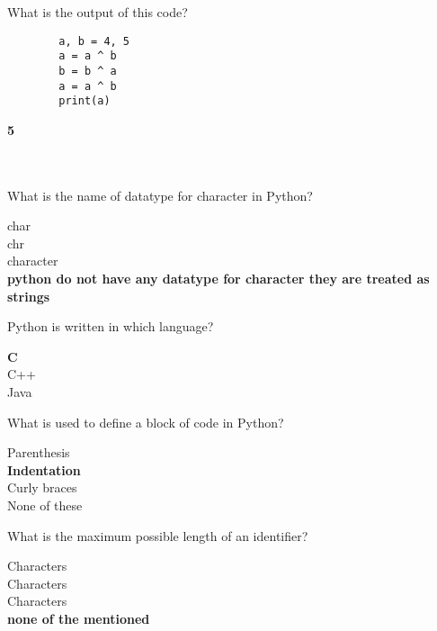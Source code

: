 \documentclass{exam}
\begin{document}
\begin{questions}
    \question  What is the output of this code? \\
    \begin{verbatim}
        a, b = 4, 5
        a = a ^ b
        b = b ^ a
        a = a ^ b
        print(a)
    \end{verbatim}
    \begin{oneparchoices}
        \choice \textbf{5} \\
         \\
         \\
    \end{oneparchoices}
    \question What is the name of datatype for character in Python?

    \begin{oneparchoices}
        \choice char \\
        \choice chr \\
        \choice character \\
        \choice \textbf{python do not have any datatype for character they are treated as strings} 
    \end{oneparchoices}

    \question Python is written in which language?

    \begin{oneparchoices}
        \choice \textbf{C} \\
        \choice C++ \\
        \choice Java \\
    \end{oneparchoices}

    \question What is used to define a block of code in Python?

    \begin{oneparchoices}
        \choice Parenthesis \\
        \choice \textbf{Indentation} \\
        \choice Curly braces \\
        \choice None of these
    \end{oneparchoices}

    \question What is the maximum possible length of an identifier?

    \begin{oneparchoices}
         Characters \\
         Characters \\
         Characters \\
        \choice \textbf{none of the mentioned}
    \end{oneparchoices}


\end{questions}
\end{document}
